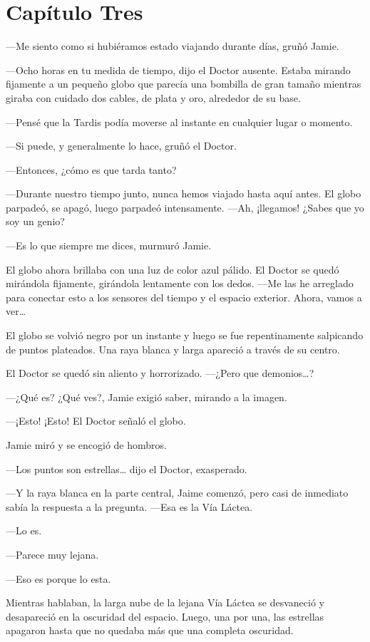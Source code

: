 \chapter*{Capítulo Tres}

---Me siento como si hubiéramos estado viajando durante días, gruñó
Jamie.

---Ocho horas en tu medida de tiempo, dijo el Doctor ausente. Estaba
mirando fijamente a un pequeño globo que parecía una bombilla de gran
tamaño mientras giraba con cuidado dos cables, de plata y oro, alrededor
de su base.

---Pensé que la Tardis podía moverse al instante en cualquier lugar o
momento.

---Si puede, y generalmente lo hace, gruñó el Doctor.

---Entonces, ¿cómo es que tarda tanto?

---Durante nuestro tiempo junto, nunca hemos viajado hasta aquí antes.
El globo  parpadeó, se apagó, luego parpadeó intensamente. ---Ah,
¡llegamos! ¿Sabes que yo soy un genio?

---Es lo que siempre me dices, murmuró Jamie.

El globo ahora brillaba con una luz de color azul pálido. El Doctor se
quedó mirándola fijamente, girándola lentamente con los dedos. ---Me las
he arreglado para conectar esto a los sensores del tiempo y el espacio
exterior. Ahora, vamos a ver\ldots{}

El globo se volvió negro por un instante y luego se fue repentinamente
salpicando de puntos plateados. Una raya blanca y larga apareció a
través de su centro.

El Doctor se quedó sin aliento y horrorizado. ---¿Pero que
demonios\ldots{}?

---¿Qué es? ¿Qué ves?, Jamie exigió saber, mirando a la imagen.

---¡Esto! ¡Esto! El Doctor señaló el globo.

Jamie miró y se encogió de hombros.

---Los puntos son estrellas\ldots{} dijo el Doctor, exasperado.

---Y la raya blanca en la parte central, Jaime comenzó, pero casi de
inmediato sabía la respuesta a la pregunta. ---Esa es la Vía Láctea.

---Lo es.

---Parece muy lejana.

---Eso es porque lo esta.

Mientras hablaban, la larga nube de la lejana Vía Láctea se desvaneció y
desapareció en la oscuridad del espacio. Luego, una por una, las
estrellas apagaron hasta que no quedaba más que una completa oscuridad.

